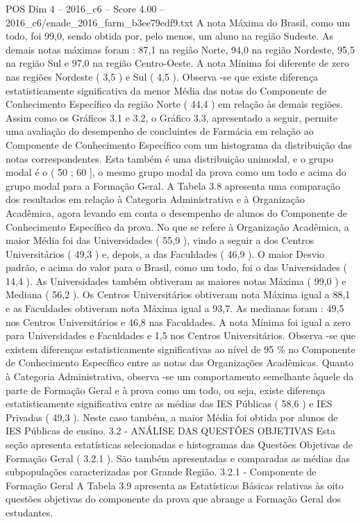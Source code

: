 \begin{textsample}{POS Dim 4 – 2016\_c6 – Score 4.00 – 2016\_c6/enade\_2016\_farm\_b3ee79edf9.txt}
A nota Máxima do Brasil, como um todo, foi 99,0, sendo obtida por, pelo menos, um aluno na região Sudeste.
As demais notas máximas foram : 87,1 na região Norte, 94,0 na região Nordeste, 95,5 na região Sul e 97,0 na região Centro-Oeste.
A nota Mínima foi diferente de zero nas regiões Nordeste ( 3,5 ) e Sul ( 4,5 ).
Observa -se que existe diferença estatisticamente significativa da menor Média das notas do Componente de Conhecimento Específico da região Norte ( 44,4 ) em relação às demais regiões.
Assim como os Gráficos 3.1 e 3.2, o Gráfico 3.3, apresentado a seguir, permite uma avaliação do desempenho de concluintes de Farmácia em relação ao Componente de Conhecimento Específico com um histograma da distribuição das notas correspondentes.
Esta também é uma distribuição unimodal, e o grupo modal é o ( 50 ; 60 ], o mesmo grupo modal da prova como um todo e acima do grupo modal para a Formação Geral.
A Tabela 3.8 apresenta uma comparação dos resultados em relação à Categoria Administrativa e à Organização Acadêmica, agora levando em conta o desempenho de alunos do Componente de Conhecimento Específico da prova.
No que se refere à Organização Acadêmica, a maior Média foi das Universidades ( 55,9 ), vindo a seguir a dos Centros Universitários ( 49,3 ) e, depois, a das Faculdades ( 46,9 ).
O maior Desvio padrão, e acima do valor para o Brasil, como um todo, foi o das Universidades ( 14,4 ).
As Universidades também obtiveram as maiores notas Máxima ( 99,0 ) e Mediana ( 56,2 ).
Os Centros Universitários obtiveram nota Máxima igual a 88,1 e as Faculdades obtiveram nota Máxima igual a 93,7.
As medianas foram : 49,5 nos Centros Universitários e 46,8 nas Faculdades.
A nota Mínima foi igual a zero para Universidades e Faculdades e 1,5 nos Centros Universitários.
Observa -se que existem diferenças estatisticamente significativas ao nível de 95 \% no Componente de Conhecimento Específico entre as notas das Organizações Acadêmicas.
Quanto à Categoria Administrativa, observa -se um comportamento semelhante àquele da parte de Formação Geral e à prova como um todo, ou seja, existe diferença estatisticamente significativa entre as médias das IES Públicas ( 58,6 ) e IES Privadas ( 49,3 ).
Neste caso também, a maior Média foi obtida por alunos de IES Públicas de ensino. 3.2 - ANÁLISE DAS QUESTÕES OBJETIVAS Esta seção apresenta estatísticas selecionadas e histogramas das Questões Objetivas de Formação Geral ( 3.2.1 ).
São também apresentadas e comparadas as médias das subpopulações caracterizadas por Grande Região. 3.2.1 - Componente de Formação Geral A Tabela 3.9 apresenta as Estatísticas Básicas relativas às oito questões objetivas do componente da prova que abrange a Formação Geral dos estudantes.

\end{textsample}
